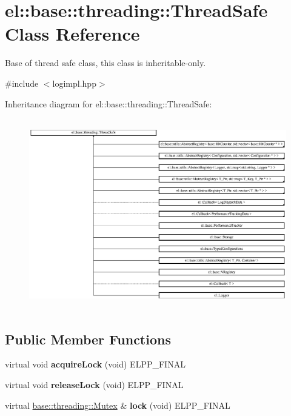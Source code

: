 \hypertarget{classel_1_1base_1_1threading_1_1ThreadSafe}{\section{el\-:\-:base\-:\-:threading\-:\-:Thread\-Safe Class Reference}
\label{classel_1_1base_1_1threading_1_1ThreadSafe}
}


Base of thread safe class, this class is inheritable-\/only.  




{\ttfamily \#include $<$logimpl.\-hpp$>$}

Inheritance diagram for el\-:\-:base\-:\-:threading\-:\-:Thread\-Safe\-:\begin{figure}[H]
\begin{center}
\leavevmode
\includegraphics[height=8.349900cm]{classel_1_1base_1_1threading_1_1ThreadSafe}
\end{center}
\end{figure}
\subsection*{Public Member Functions}
\begin{DoxyCompactItemize}
\item 
\hypertarget{classel_1_1base_1_1threading_1_1ThreadSafe_a59db719b214f7118f0919846a85077bf}{virtual void {\bfseries acquire\-Lock} (void) E\-L\-P\-P\-\_\-\-F\-I\-N\-A\-L}\label{classel_1_1base_1_1threading_1_1ThreadSafe_a59db719b214f7118f0919846a85077bf}

\item 
\hypertarget{classel_1_1base_1_1threading_1_1ThreadSafe_a95bb166242b9691f861274a9b8ced2d9}{virtual void {\bfseries release\-Lock} (void) E\-L\-P\-P\-\_\-\-F\-I\-N\-A\-L}\label{classel_1_1base_1_1threading_1_1ThreadSafe_a95bb166242b9691f861274a9b8ced2d9}

\item 
\hypertarget{classel_1_1base_1_1threading_1_1ThreadSafe_affb45b35790a7305d0a659562c8104fc}{virtual \hyperlink{classel_1_1base_1_1threading_1_1internal_1_1NoMutex}{base\-::threading\-::\-Mutex} \& {\bfseries lock} (void) E\-L\-P\-P\-\_\-\-F\-I\-N\-A\-L}\label{classel_1_1base_1_1threading_1_1ThreadSafe_affb45b35790a7305d0a659562c8104fc}

\end{DoxyCompactItemize}



